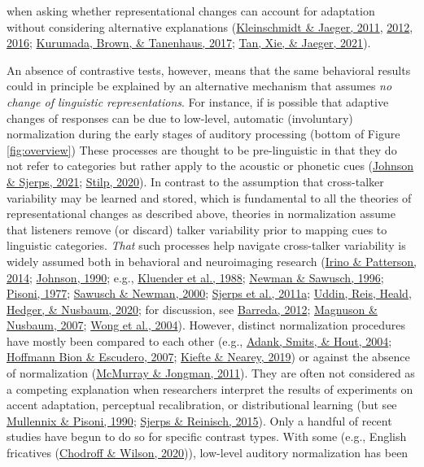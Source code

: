 \documentclass[
  11pt,
  english,
  man,floatsintext]{apa6}
\begin{document}
when asking whether representational changes can account for adaptation without considering alternative explanations (\protect\hyperlink{ref-kleinschmidt-jaeger2011}{Kleinschmidt \& Jaeger, 2011}, \protect\hyperlink{ref-kleinschmidt-jaeger2012}{2012}, \protect\hyperlink{ref-kleinschmidt-jaeger2016cogsci}{2016}; \protect\hyperlink{ref-kurumada2017}{Kurumada, Brown, \& Tanenhaus, 2017}; \protect\hyperlink{ref-tan2021}{Tan, Xie, \& Jaeger, 2021}).

An absence of contrastive tests, however, means that the same behavioral results could in principle be explained by an alternative mechanism that assumes \emph{no change of linguistic representations}. For instance, if is possible that adaptive changes of responses can be due to low-level, automatic (involuntary) normalization during the early stages of auditory processing (bottom of Figure \ref{fig:overview}) These processes are thought to be pre-linguistic in that they do not refer to categories but rather apply to the acoustic or phonetic cues (\protect\hyperlink{ref-johnson-sjerps2021}{Johnson \& Sjerps, 2021}; \protect\hyperlink{ref-stilp2020}{Stilp, 2020}). In contrast to the assumption that cross-talker variability may be learned and stored, which is fundamental to all the theories of representational changes as described above, theories in normalization assume that listeners remove (or discard) talker variability prior to mapping cues to linguistic categories. \emph{That} such processes help navigate cross-talker variability is widely assumed both in behavioral and neuroimaging research (\protect\hyperlink{ref-irino-patterson2014}{Irino \& Patterson, 2014}; \protect\hyperlink{ref-johnson1990}{Johnson, 1990}; e.g., \protect\hyperlink{ref-kluender1988}{Kluender et al., 1988}; \protect\hyperlink{ref-newman-sawusch1996}{Newman \& Sawusch, 1996}; \protect\hyperlink{ref-pisoni1977}{Pisoni, 1977}; \protect\hyperlink{ref-sawusch-newman2000}{Sawusch \& Newman, 2000}; \protect\hyperlink{ref-sjerps2011}{Sjerps et al., 2011a}; \protect\hyperlink{ref-uddin2020}{Uddin, Reis, Heald, Hedger, \& Nusbaum, 2020}; for discussion, see \protect\hyperlink{ref-barreda2012}{Barreda, 2012}; \protect\hyperlink{ref-magnuson-nusbaum2007}{Magnuson \& Nusbaum, 2007}; \protect\hyperlink{ref-wong2004}{Wong et al., 2004}). However, distinct normalization procedures have mostly been compared to each other (e.g., \protect\hyperlink{ref-adank2004}{Adank, Smits, \& Hout, 2004}; \protect\hyperlink{ref-hoffmanbion-escudero2007}{Hoffmann Bion \& Escudero, 2007}; \protect\hyperlink{ref-kiefte-nearey2019}{Kiefte \& Nearey, 2019}) or against the absence of normalization (\protect\hyperlink{ref-mcmurray-jongman2011}{McMurray \& Jongman, 2011}). They are often not considered as a competing explanation when researchers interpret the results of experiments on accent adaptation, perceptual recalibration, or distributional learning (but see \protect\hyperlink{ref-mullennix-pisoni1990}{Mullennix \& Pisoni, 1990}; \protect\hyperlink{ref-sjerps-reinisch2015}{Sjerps \& Reinisch, 2015}). Only a handful of recent studies have begun to do so for specific contrast types. With some (e.g., English fricatives (\protect\hyperlink{ref-chodroff-wilson2020}{Chodroff \& Wilson, 2020})), low-level auditory normalization has been 
\end{document}
